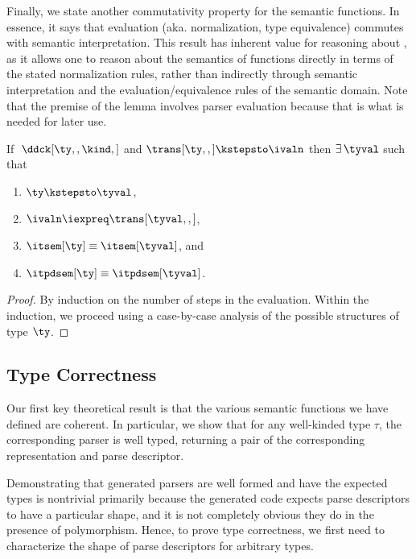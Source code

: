 
Finally, we state another commutativity property for the semantic
functions. In essence, it says that evaluation (aka. normalization,
type equivalence) commutes with semantic interpretation. This result
has inherent value for reasoning about \ddc{}, as it allows one to
reason about the semantics of \ddc{} functions directly in terms of
the stated normalization rules, rather than indirectly through
semantic interpretation and the evaluation/equivalence rules of the
semantic domain. Note that the premise of the lemma involves parser
evaluation because that is what is needed for later use.

\begin{lemma}
  If $\; \ddck[\ty,,\kind,]$ and $\trans[\ty,,] \kstepsto \ivaln$ then
  $\exists\, \tyval$ such that
  \begin{enumerate}
  \item $\ty \kstepsto \tyval$,
  \item $\ivaln \iexpreq \trans[\tyval,,]$,
  \item $\itsem[\ty] \equiv \itsem[\tyval]$, and
  \item $\itpdsem[\ty] \equiv \itpdsem[\tyval]$.
  \end{enumerate}
\label{lemma:eval-corr}
\end{lemma}
\begin{proof}
  By induction on the number of steps in the evaluation.  Within the
  induction, we proceed using a case-by-case analysis of the possible
  structures of type $\ty$. 
\end{proof}


\subsection{Type Correctness}
Our first key theoretical result is that the various semantic
functions we have defined are coherent.  In particular, we show that
for any well-kinded \ddca{} type $\tau$, the corresponding parser is
well typed, returning a pair of the corresponding representation and
parse descriptor.

Demonstrating that generated parsers are well formed
and have the expected types is nontrivial primarily because
the generated code expects parse descriptors to have a particular shape,
and it is not completely obvious they do in the presence of polymorphism.
Hence, to prove type correctness, we first need to characterize the shape of
parse descriptors for arbitrary \ddc{} types.   

